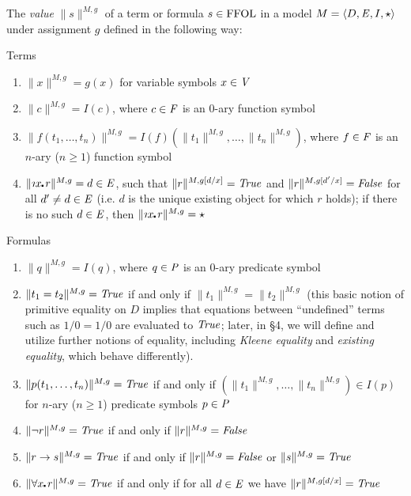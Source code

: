 \begin{defn}
  The \emph{value} $\| s \|^{M,g}$ of a term or formula $s\in\FFOL$
  in a model $M=\langle D, \ex, I, \star\rangle$ under assignment $g$ 
  defined in the following way:
\noindent
\begin{description}
\item{Terms}
\begin{enumerate}
\item $\| x \|^{M,g} = g(x)$ for variable symbols $x\in\V$
\item $\| c \|^{M,g} = I(c)$, where $c\in\F$ is an $0$-ary function symbol
\item $\| f(t_1,\ldots,t_n)\|^{M,g} = I(f)(\| t_1 \|^{M,g},\ldots,\|
  t_n \|^{M,g})$, where $f\in\F$ is an $n$-ary ($n\geq 1$) function symbol
\item $\| \Descr x\lambdot r \|^{M,g} = d \in \ex$, such that $\| r
  \|^{M,g[d/x]} = \True$ and  $\| r
  \|^{M,g[d'/x]} = \False$ for all $d'\not=d\in \ex$ (i.e. $d$ is the
  unique existing object for which $r$ holds); if there is no
  such $d\in \ex$, then $\| \Descr x\lambdot r \|^{M,g} = \star$
 \setcounter{enumTemp}{\theenumi}
\end{enumerate}

\item{Formulas}
\begin{enumerate}
\setcounter{enumi}{\theenumTemp}
\item $\| q \|^{M,g} = I(q)$, where $q\in\P$ is an $0$-ary predicate
  symbol
\item $\| t_1 = t_2 \|^{M,g} = \True$ if and only if $\| t_1 \|^{M,g} = \| t_2
  \|^{M,g}$ (this basic notion of primitive equality on $D$ implies
  that equations between ``undefined'' terms such as $1/0 = 1/0$ are
  evaluated to $\True$; later, in \S4, we will
  define and utilize further notions of equality, including \emph{Kleene equality}
  and \emph{existing equality}, which behave differently).
\item $\| p(t_1,\ldots,t_n) \|^{M,g} = \True$ if and only if $(\| t_1 \|^{M,g},\ldots,\|
  t_n \|^{M,g}) \in I(p)$ for $n$-ary ($n\geq 1$) predicate symbols
  $p\in\P$
\item $\| \neg r \|^{M,g} = \True$ if and only if $\| r \|^{M,g} = \False$
\item $\| r \Impl s \|^{M,g} = \True$ if and only if $\| r \|^{M,g} = \False$
  or $\| s \|^{M,g} = \True$
\item $\| \forall x\lambdot r  \|^{M,g} = \True$ if and only if for all $d \in \ex$ we
  have $\|  r  \|^{M,g[d/x]} = \True$ %
\end{enumerate}
\end{description}

\end{defn}
 

